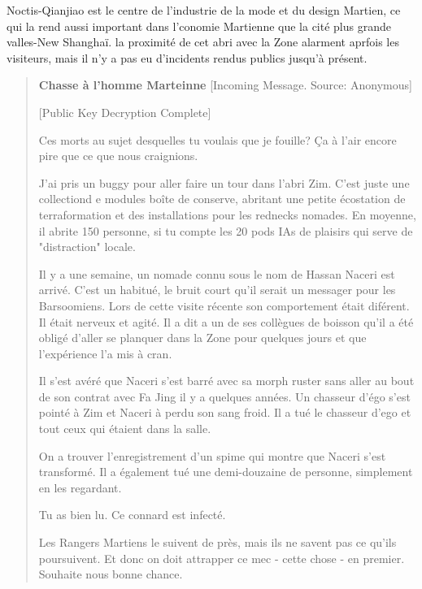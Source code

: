                                                             Noctis-Qianjiao est le centre de l'industrie de la mode et du design Martien, ce qui la rend aussi important dans l'conomie Martienne que la cité plus grande valles-New Shanghaï. la proximité de cet abri avec la Zone alarment aprfois les visiteurs, mais il n'y a pas eu d'incidents rendus publics jusqu'à présent. 

                                                            \begin{quotation} \textbf{Chasse à l'homme Marteinne} [Incoming Message. Source: Anonymous] 

                                                               [Public Key Decryption Complete] 

                                                               Ces morts au sujet desquelles tu voulais que je fouille? Ça à l'air encore pire que ce que nous craignions. 

                                                               J'ai pris un buggy pour aller faire un tour dans l'abri Zim. C'est juste une collectiond e modules boîte de conserve, abritant une petite écostation de terraformation et des installations pour les rednecks nomades. En moyenne, il abrite 150 personne, si tu compte les 20 pods IAs de plaisirs qui serve de "distraction" locale. 

                                                               Il y a une semaine, un nomade connu sous le nom de Hassan Naceri est arrivé. C'est un habitué, le bruit court qu'il serait un messager pour les Barsoomiens. Lors de cette visite récente son comportement était diférent. Il était nerveux et agité. Il a dit a un de ses collègues de boisson qu'il a été obligé d'aller se planquer dans la Zone pour quelques jours et que l'expérience l'a mis à cran. 

                                                               Il s'est avéré que Naceri s'est barré avec sa morph ruster sans aller au bout de son contrat avec Fa Jing il y a quelques années. Un chasseur d'égo s'est pointé à Zim et Naceri à perdu son sang froid. Il a tué le chasseur d'ego et tout ceux qui étaient dans la salle. 

                                                               On a trouver l'enregistrement d'un spime qui montre que Naceri s'est transformé. Il a également tué une demi-douzaine de personne, simplement en les regardant. 

                                                               Tu as bien lu. Ce connard est infecté. 

                                                               Les Rangers Martiens le suivent de près, mais ils ne savent pas ce qu'ils poursuivent. Et donc on doit attrapper ce mec - cette chose - en premier. Souhaite nous bonne chance. \end{quotation} 

